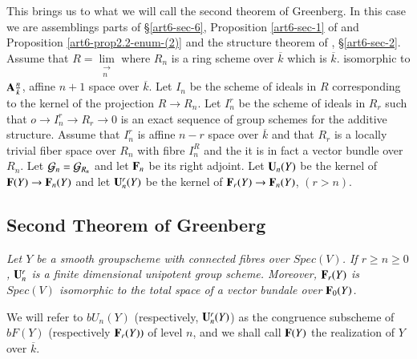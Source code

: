 This brings us to what we will call the second theorem of Greenberg. In this case we are assemblings parts of \S \ref{art6-sec-6}, Proposition \ref{art6-sec-1} of \cite{art6-keyMG-I} and Proposition \ref{art6-prop2.2-enum-(2)} and the structure theorem of \cite{art6-keyMG II}, \S \ref{art6-sec-2}. Assume that $R= \lim\limits_{\substack{\longrightarrow \\n}}$ where $R_{n}$ is a ring scheme over $\overline{k}$ which is $\overline{k}$. isomorphic to $\mathbf{A}\frac{n}{k}$, affine $n+1$ space over $\overline{k}$. Let $I_{n}$ be the scheme of ideals in $R$ corresponding to the kernel of the projection $R \rightarrow R_{n}$. Let $I_{n}^{r}$ be the scheme of ideals in $R_{r}$ such that $o\rightarrow I_{n}^{r} \rightarrow R_{r}\rightarrow 0$ is an exact sequence of group schemes for the additive structure. Assume that $I_{n}^{r}$ is affine $n-r$ space over $\overline{k}$ and that $R_{r}$ is a locally trivial fiber space over $R_{n}$ with fibre $I_{n}^{R}$ and the it is in fact a vector bundle over $R_{n}$. Let $\mathcal{G}_{n} = \mathcal{G}_{R_{n}}$ and let $\mathbf{F}_{n}$ be its right adjoint. Let $\mathbf{U}_{n}(Y)$ be the kernel of $\mathbf{F}(Y) \rightarrow \mathbf{F}_{n}(Y)$ and let $\mathbf{U}_{n}^{r}(Y)$ be the kernel of $\mathbf{F}_{r}(Y) \rightarrow \mathbf{F}_{n}(Y)$, $(r > n)$. 

\subsection{Second Theorem of Greenberg}\label{art6-subsec-12.2}
\textit{Let $Y$ be a smooth group\break scheme with connected fibres over $Spec(V)$. If $r \geq n \geq 0$, $\mathbf{U}_{n}^{r}$ is a finite dimensional unipotent group scheme.  Moreover, $\mathbf{F}_{r}(Y)$ is $Spec(V)$ isomorphic to the total space of a vector bundale over $\mathbf{F}_{0}(Y)$.}

We will refer to $bU_{n}(Y)$ (respectively, $\mathbf{U}_{n}^{r}(Y)$) as the congruence subscheme of $bF(Y)$ (respectively $\mathbf{F}_{r}(Y))$ of level $n$, and we shall call $\mathbf{F}(Y)$ the realization of $Y$ over $\overline{k}$.


